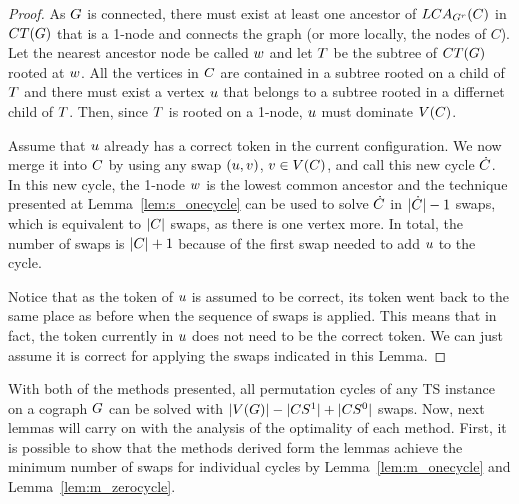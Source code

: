 \documentclass[msc,english,table,xcdraw]{ppgccufmg}
\begin{document}
\begin{proof}

As $G$ is connected, there must exist at least one ancestor of $LCA_{G^{r}}(C)$ in $CT(G)$ that is a 1-node and connects the graph (or more locally, the nodes of $C$). 
Let the nearest ancestor node be called $w$ and let $T$ be the subtree of $CT(G)$ rooted at $w$.
All the vertices in $C$ are contained in a subtree rooted on a child of $T$ and there must exist a vertex $u$ that belongs to a subtree rooted in a differnet child of $T$. 
Then, since $T$ is rooted on a 1-node, $u$ must dominate $V(C)$.

Assume that $u$ already has a correct token in the current configuration. We now merge it into $C$ by using any swap $(u,
v)$, $v \in V(C)$, and call this new cycle $\dot{C}$.
In this new cycle, the 1-node $w$ is the lowest common ancestor and the
technique presented at Lemma~\ref{lem:s_onecycle} can be used to solve $\dot{C}$ in 
$|\dot{C}| - 1$ swaps, which is equivalent to $|C|$
swaps, as there is one vertex more. 
In total, the number of swaps is $|C| + 1$ because of the first swap 
needed to add $u$ to the cycle.

Notice that as the token of $u$ is assumed to be correct, its token went
back to the same place as before when the sequence of swaps is applied.
This means that in fact, the token currently in $u$ does not need to be the correct token. We can just assume it is correct for applying the swaps indicated in this Lemma. 
\end{proof}


With both of the methods presented, all permutation cycles of any TS instance
on a cograph $G$ can be solved with $|V(G)| - |CS^{1}| + 
|CS^{0}|$ swaps.
Now, next lemmas will carry on with the analysis of the optimality of each method.
First, it is possible to show that the methods derived form the lemmas achieve the minimum
number of swaps for individual cycles by Lemma~\ref{lem:m_onecycle} and
Lemma~\ref{lem:m_zerocycle}.
\end{document}
